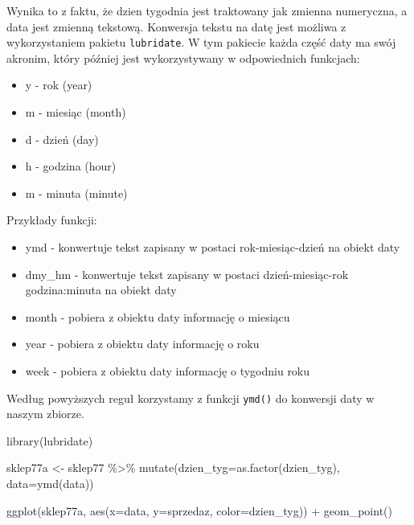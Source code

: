 \documentclass[
  letterpaper,
  DIV=11,
  numbers=noendperiod]{scrreprt}
\newenvironment{Shaded}{\begin{snugshade}}{\end{snugshade}}
\newcommand{\AttributeTok}[1]{\textcolor[rgb]{0.40,0.45,0.13}{#1}}
\newcommand{\FunctionTok}[1]{\textcolor[rgb]{0.28,0.35,0.67}{#1}}
\newcommand{\NormalTok}[1]{\textcolor[rgb]{0.00,0.23,0.31}{#1}}
\newcommand{\OtherTok}[1]{\textcolor[rgb]{0.00,0.23,0.31}{#1}}
\newcommand{\SpecialCharTok}[1]{\textcolor[rgb]{0.37,0.37,0.37}{#1}}
\providecommand{\tightlist}{%
  \setlength{\itemsep}{0pt}\setlength{\parskip}{0pt}}\usepackage{longtable,booktabs,array}
\begin{document}
Wynika to z faktu, że dzien tygodnia jest traktowany jak zmienna
numeryczna, a data jest zmienną tekstową. Konwersja tekstu na datę jest
możliwa z wykorzystaniem pakietu \texttt{lubridate}. W tym pakiecie
każda część daty ma swój akronim, który później jest wykorzystywany w
odpowiednich funkcjach:

\begin{itemize}
\tightlist
\item
  y - rok (year)
\item
  m - miesiąc (month)
\item
  d - dzień (day)
\item
  h - godzina (hour)
\item
  m - minuta (minute)
\end{itemize}

Przykłady funkcji:

\begin{itemize}
\tightlist
\item
  ymd - konwertuje tekst zapisany w postaci rok-miesiąc-dzień na obiekt
  daty
\item
  dmy\_hm - konwertuje tekst zapisany w postaci dzień-miesiąc-rok
  godzina:minuta na obiekt daty
\item
  month - pobiera z obiektu daty informację o miesiącu
\item
  year - pobiera z obiektu daty informację o roku
\item
  week - pobiera z obiektu daty informację o tygodniu roku
\end{itemize}

Według powyższych reguł korzystamy z funkcji \texttt{ymd()} do konwersji
daty w naszym zbiorze.

\begin{Shaded}
\begin{Highlighting}[]
\FunctionTok{library}\NormalTok{(lubridate)}

\NormalTok{sklep77a }\OtherTok{\textless{}{-}}\NormalTok{ sklep77 }\SpecialCharTok{\%\textgreater{}\%}
  \FunctionTok{mutate}\NormalTok{(}\AttributeTok{dzien\_tyg=}\FunctionTok{as.factor}\NormalTok{(dzien\_tyg),}
         \AttributeTok{data=}\FunctionTok{ymd}\NormalTok{(data))}

\FunctionTok{ggplot}\NormalTok{(sklep77a, }\FunctionTok{aes}\NormalTok{(}\AttributeTok{x=}\NormalTok{data,}
                    \AttributeTok{y=}\NormalTok{sprzedaz,}
                    \AttributeTok{color=}\NormalTok{dzien\_tyg)) }\SpecialCharTok{+}
  \FunctionTok{geom\_point}\NormalTok{()}
\end{Highlighting}
\end{Shaded}
\end{document}
